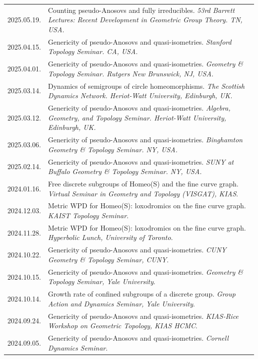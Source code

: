 \documentclass[a4paper, 10pt]{article}
\begin{document}
\begin{tabular}{Q{2.45cm}P{13cm}}
\small{2025.05.19.} & Counting pseudo-Anosovs and fully irreducibles. \textit{53rd Barrett Lectures: Recent Development in Geometric Group Theory. TN, USA.}\\
\small{2025.04.15.} & Genericity of pseudo-Anosovs and quasi-isometries. \textit{Stanford Topology Seminar. CA, USA.}\\
\small{2025.04.01.}  & Genericity of pseudo-Anosovs and quasi-isometries. \textit{Geometry \& Topology Seminar. Rutgers New Brunswick, NJ, USA.}\\
\small{2025.03.14.}&  Dynamics of semigroups of circle homeomorphisms. \textit{The Scottish Dynamics Network. Heriot-Watt University, Edinburgh, UK.}\\
\small{2025.03.12.} &Genericity of pseudo-Anosovs and quasi-isometries. \textit{Algebra, Geometry, and Topology Seminar. Heriot-Watt University, Edinburgh, UK.}\\
\small{2025.03.06.}& Genericity of pseudo-Anosovs and quasi-isometries. \textit{Binghamton Geometry \& Topology Seminar. NY, USA.}\\
\small{2025.02.14.} &Genericity of pseudo-Anosovs and quasi-isometries. \textit{SUNY at Buffalo Geometry \& Topology Seminar. NY, USA.} \\
\small{2024.01.16.} &Free discrete subgroups of Homeo(S) and the fine curve graph. \textit{Virtual Seminar in Geometry and Topology (VISGAT), KIAS}.  \\
\small{2024.12.03.} &Metric WPD for Homeo(S): loxodromics on the fine curve graph. \textit{KAIST Topology Seminar}.  \\
\small{2024.11.28.} &Metric WPD for Homeo(S): loxodromics on the fine curve graph. \textit{Hyperbolic Lunch, University of Toronto}.  \\
\small{2024.10.22.} &Genericity of pseudo-Anosovs and quasi-isometries. \textit{CUNY Geometry \& Topology Seminar, CUNY}.  \\
\small{2024.10.15.} &Genericity of pseudo-Anosovs and quasi-isometries. \textit{Geometry \& Topology Seminar, Yale University}. \\
\small{2024.10.14.} &Growth rate of confined subgroups of a discrete group. \textit{Group Action and Dynamics Seminar, Yale University}.\\
\small{2024.09.24.} & Genericity of pseudo-Anosovs and quasi-isometries. \textit{KIAS-Rice Workshop on Geometric Topology, KIAS HCMC}. \\
\small{2024.09.05.} & Genericity of pseudo-Anosovs and quasi-isometries. \textit{Cornell Dynamics Seminar}.\\

\end{tabular}
\end{document}
